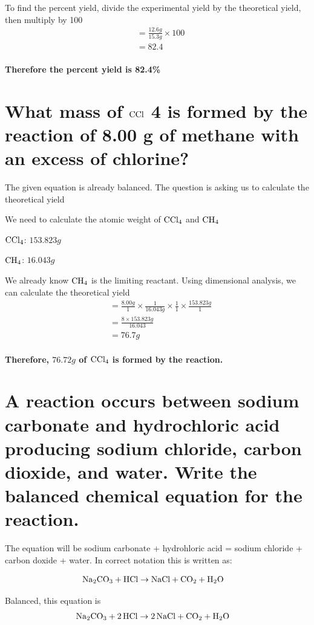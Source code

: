 \documentclass{scrartcl}
\begin{document}
To find the percent yield, divide the experimental yield by the theoretical
yield, then multiply by 100
\begin{align*}
  &=\frac{12.6g}{15.3g}\times100\\
  &=82.4\\
\end{align*}

\textbf{Therefore the percent yield is 82.4\%}

\section{What mass of \(\ce{CCl}\) 4 is formed by the reaction of 8.00 g of methane with an excess of chlorine?}
\label{sec:orgd0ddce4}
The given equation is already balanced. The question is asking us to calculate
the theoretical yield

We need to calculate the atomic weight of \(\ce{CCl4}\) and \(\ce{CH4}\)

\(\ce{CCl4}\): \(153.823g\)

\(\ce{CH4}\): \(16.043g\)

We already know \(\ce{CH4}\) is the limiting reactant. Using dimensional analysis, we can calculate the theoretical yield
\begin{align*}
&=\frac{8.00g}{1}\times\frac{1}{16.043g}\times \frac{1}{1}\times \frac{153.823g}{1}\\
&=\frac{8 \times 153.823g}{16.043}\\
&=76.7g\\
\end{align*}

\textbf{Therefore, \(76.72g\) of \(\ce{CCl4}\) is formed by the reaction.}

\section{A reaction occurs between sodium carbonate and hydrochloric acid producing sodium chloride, carbon dioxide, and water. Write the balanced chemical equation for the reaction.}
\label{sec:org835cfaa}
The equation will be sodium carbonate + hydrohloric acid = sodium chloride +
carbon doxide + water. In correct notation this is written as:

\begin{align*}
&\ce{Na2CO3 + HCl}\rightarrow\ce{NaCl + CO2 + H2O}
\end{align*}

Balanced, this equation is
\begin{align*}
&\ce{Na2CO3 + 2HCl}\rightarrow\ce{2NaCl + CO2 + H2O}
\end{align*}
\end{document}
